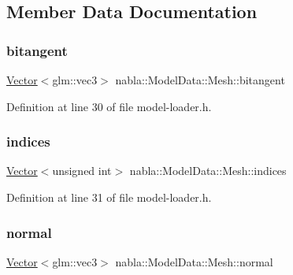\subsection{Member Data Documentation}
\mbox{\label{structnabla_1_1_model_data_1_1_mesh_a3ad6246750089694a168d22277dc4971}} 
\subsubsection{\texorpdfstring{bitangent}{bitangent}}
{\footnotesize\ttfamily \mbox{\hyperlink{namespacenabla_a34f7ca8c9af290f9af3ed299236ff959}{Vector}}$<$glm\+::vec3$>$ nabla\+::\+Model\+Data\+::\+Mesh\+::bitangent}



Definition at line 30 of file model-\/loader.\+h.

\mbox{\label{structnabla_1_1_model_data_1_1_mesh_a7bfc90e899a5ce03f521165e47324dab}} 
\subsubsection{\texorpdfstring{indices}{indices}}
{\footnotesize\ttfamily \mbox{\hyperlink{namespacenabla_a34f7ca8c9af290f9af3ed299236ff959}{Vector}}$<$unsigned int$>$ nabla\+::\+Model\+Data\+::\+Mesh\+::indices}



Definition at line 31 of file model-\/loader.\+h.

\mbox{\label{structnabla_1_1_model_data_1_1_mesh_ae4ed9896e1991cf26b0e8400691c4db7}} 
\subsubsection{\texorpdfstring{normal}{normal}}
{\footnotesize\ttfamily \mbox{\hyperlink{namespacenabla_a34f7ca8c9af290f9af3ed299236ff959}{Vector}}$<$glm\+::vec3$>$ nabla\+::\+Model\+Data\+::\+Mesh\+::normal}



